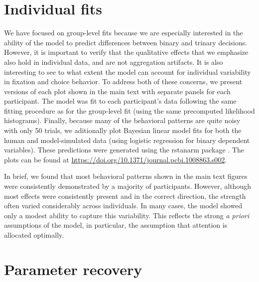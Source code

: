 \section{Individual fits}\label{app:attention-individual}
We have focused on group-level fits because we are especially interested in the ability of the model to predict differences between binary and trinary decisions. However, it is important to verify that the qualitative effects that we emphasize also hold in individual data, and are not aggregation artifacts. It is also interesting to see to what extent the model can account for individual variability in fixation and choice behavior. To address both of these concerns, we present versions of each plot shown in the main text with separate panels for each participant. The model was fit to each participant's data following the same fitting procedure as for the group-level fit (using the same precomputed likelihood histograms). Finally, because many of the behavioral patterns are quite noisy with only 50 trials, we aditionally plot Bayesian linear model fits for both the human and model-simulated data (using logistic regression for binary dependent variables). These predictions were generated using the rstanarm package \citep{rstanarm}. The plots can be found at \url{https://doi.org/10.1371/journal.pcbi.1008863.s002}.

In brief, we found that most behavioral patterns shown in the main text figures were consistently demonstrated by a majority of participants. However, although most effects were consistently present and in the correct direction, the strength often varied considerably across individuals. In many cases, the model showed only a modest ability to capture this variability. This reflects the strong \emph{a priori} assumptions of the model, in particular, the assumption that attention is allocated optimally.


\section{Parameter recovery}\label{app:attention-recovery}

